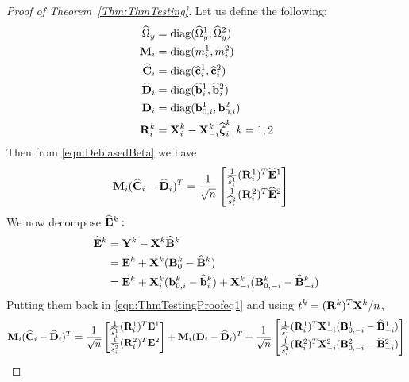 \documentclass[12pt, letterpaper]{article}
\theoremstyle{definition}
\DeclareMathOperator*{\diag}{diag }
\numberwithin{equation}{section}
\begin{document}
\begin{proof}[Proof of Theorem~\ref{Thm:ThmTesting}]
Let us define the following:
%
\begin{align*}
\widehat \Omega_y &= \diag(\widehat \Omega_y^1, \widehat \Omega_y^2)\\
\bfM_i &= \diag(m^1_i, m^2_i)\\
\widehat \bfC_i &= \diag(\widehat \bfc^1_i, \widehat \bfc^2_i)\\
\widehat \bfD_i &= \diag(\widehat \bfb^1_i, \widehat \bfb^2_i)\\
\bfD_i &= \diag(\bfb^1_{0,i}, \bfb^2_{0,i})\\
\bfR_i^k &= \bfX_i^k - \bfX_{-i}^k \widehat \bfzeta_i^k; k = 1,2
\end{align*}
%
Then from \eqref{eqn:DebiasedBeta} we have
%
\begin{align}\label{eqn:ThmTestingProofeq1}
{\mathbf{M}}_i ( \widehat {{\mathbf{C}}}_i - \widehat {{\mathbf{D}}}_i )^T &= \frac{1}{\sqrt n}
\begin{bmatrix}
\frac{1}{\widehat s^1_i} ({\mathbf{R}}^1_i)^T \widehat {{\mathbf{E}}}^1 \\
\frac{1}{\widehat s^2_i} ({\mathbf{R}}^2_i)^T \widehat {{\mathbf{E}}}^2
\end{bmatrix}
\end{align}
%
We now decompose $\widehat {{\mathbf{E}}}^k:$
%
\begin{align*}
\widehat {{\mathbf{E}}}^k &= {\mathbf{Y}}^k - {\mathbf{X}}^k \widehat {{\mathbf{B}}}^k \\
&= {\mathbf{E}}^k + {\mathbf{X}}^k ({\mathbf{B}}_0^k - \widehat {{\mathbf{B}}}^k)\\
&= {\mathbf{E}}^k + {\mathbf{X}}_i^k ({\bf{b}}_{0,i}^k - \widehat {{\bf{b}}}_i^k) + {\mathbf{X}}_{-i}^k ({\mathbf{B}}_{0,-i}^k - \widehat {{\mathbf{B}}}_{-i}^k)
\end{align*}
%
Putting them back in \eqref{eqn:ThmTestingProofeq1} and using $t^k = ({\mathbf{R}}^k)^T {\mathbf{X}}^k/n$,
%
\begin{align}
\bfM_i ( \widehat \bfC_i - \widehat \bfD_i)^T &= \frac{1}{\sqrt n}
\begin{bmatrix}
\frac{1}{\widehat s^1_i} (\bfR^1_i)^T \bfE^1 \\
\frac{1}{\widehat s^2_i} (\bfR^2_i)^T \bfE^2
\end{bmatrix} +
\bfM_i (\bfD_i - \widehat \bfD_i )^T +
\frac{1}{\sqrt n}
\begin{bmatrix}
\frac{1}{\widehat s^1_i} (\bfR^1_i)^T \bfX_{-i}^1 (\bfB_{0,-i}^1 - \widehat \bfB_{-i}^1) \\
\frac{1}{\widehat s^2_i} (\bfR^2_i)^T \bfX_{-i}^2 (\bfB_{0,-i}^2 - \widehat \bfB_{-i}^2)
\end{bmatrix} \notag\\

\end{align}
\end{proof}
\end{document}
